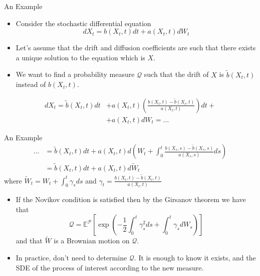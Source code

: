 \documentclass{beamer}
\begin{document}
\begin{frame}{An Example}
\begin{itemize}
	\item Consider the stochastic differential equation
	\begin{equation*}
	dX_t = b(X_t, t) dt + a(X_t, t) dW_t
	\end{equation*}
	\item Let's assume that the drift and diffusion coefficients are such that there exists a unique solution to the equation which is $X$.
	\item We want to find a probability measure $\mathcal{Q}$ such that the drift of $X$ is $\tilde{b}(X_t,t)$ instead of $b(X_t,t)$.
\end{itemize}
	\begin{equation*}
	\begin{aligned}
		dX_t = \tilde{b}(X_t,t) dt &+ a(X_t,t) \left(\frac{b(X_t,t)-\tilde{b}(X_t,t)}{a(X_t,t)}\right)dt + \\ &+ a(X_t,t) dW_t = \ldots
	\end{aligned}
	\end{equation*}
\end{frame}

\begin{frame}{An Example}
	\begin{equation*}
		\begin{aligned}
		\ldots &= \tilde{b}(X_t,t)dt+a(X_t,t)d\left(W_t + \int_0^t \frac{b(X_s,s)-\tilde{b}(X_s,s)}{a(X_s,s)} ds\right) \\
		&=\tilde{b}(X_t,t)dt+a(X_t,t)d\tilde{W}_t
		\end{aligned}
		\end{equation*}
		where $\tilde{W}_t=W_t+\int_0^t\gamma_s ds$ and $\gamma_t =\frac{b(X_t,t)-\tilde{b}(X_t,t)}{a(X_t,t)}$
	\begin{itemize}
	\item If the Novikov condition is satisfied then by the Girsanov theorem we have that
	\begin{equation}
		\mathcal{Q} = \mathbb{E}^{\mathcal{P}}\left[\exp\left(-\frac{1}{2}\int_0^t \gamma_s^2 ds + \int_0^t \gamma_s dW_s \right)\right]
	\end{equation}
	and that $\tilde{W}$ is a Brownian motion on $\mathcal{Q}$.
	\item In practice, don't need to determine $\mathcal{Q}$. It is enough to know it exists, and the SDE of the process of interest according to the new measure.	
	\end{itemize}
\end{frame}
\end{document}
